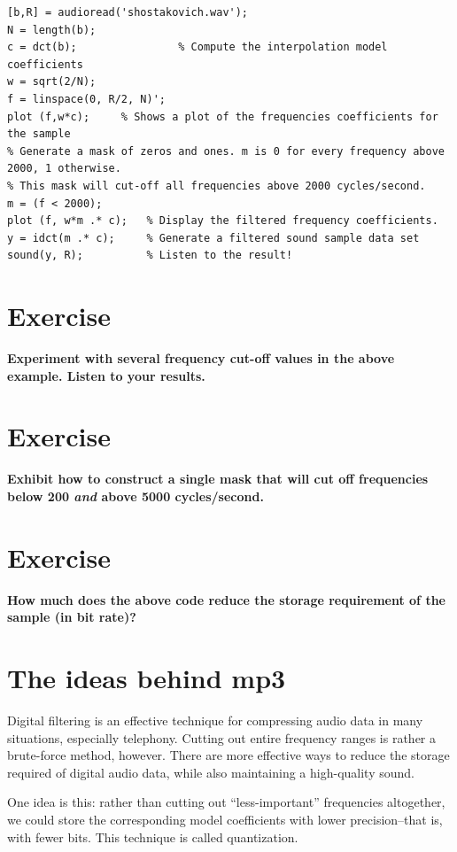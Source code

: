 \documentclass[10pt]{article}
\begin{document}
\begin{verbatim}
[b,R] = audioread('shostakovich.wav');
N = length(b);
c = dct(b);                % Compute the interpolation model coefficients
w = sqrt(2/N);
f = linspace(0, R/2, N)';
plot (f,w*c);     % Shows a plot of the frequencies coefficients for the sample
% Generate a mask of zeros and ones. m is 0 for every frequency above 2000, 1 otherwise.
% This mask will cut-off all frequencies above 2000 cycles/second.
m = (f < 2000);
plot (f, w*m .* c);   % Display the filtered frequency coefficients.
y = idct(m .* c);     % Generate a filtered sound sample data set
sound(y, R);          % Listen to the result!
\end{verbatim}

\section*{Exercise}
{\bf Experiment with several frequency cut-off values in the above example.
Listen to your results. }

\section*{Exercise}
{\bf Exhibit how to construct a single mask that will
cut off frequencies below 200 {\it and} above 5000 cycles/second. }

\section*{Exercise}
{\bf How much does the above code reduce the storage requirement of the sample
(in bit rate)?}

\break
\section*{The ideas behind mp3}
Digital filtering is an effective technique for compressing audio
data in many situations, especially telephony. Cutting out entire
frequency ranges is rather a brute-force method, however. There are
more effective ways to reduce the storage required of digital audio
data, while also maintaining a high-quality sound.

One idea is this: rather than cutting out ``less-important'' 
frequencies altogether, we could store the corresponding model 
coefficients with lower precision--that is, with fewer bits. 
This technique is called quantization.
\end{document}
